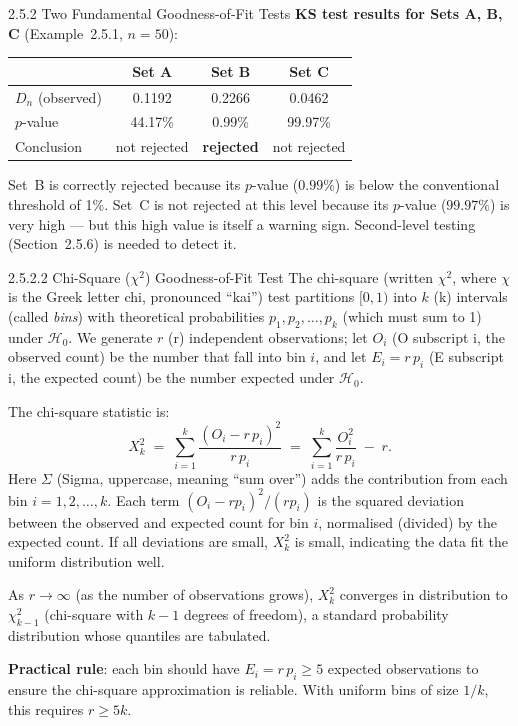 \documentclass[aspectratio=169,10pt]{beamer}
\begin{document}
\begin{frame}[allowframebreaks]{2.5.2 Two Fundamental Goodness-of-Fit Tests}
\textbf{KS test results for Sets A, B, C} (Example~2.5.1, $n=50$):
\begin{center}
\begin{tabular}{lccc}
  \toprule
  & Set A & Set B & Set C \\
  \midrule
  $D_n$ (observed) & 0.1192 & 0.2266 & 0.0462 \\
  $p$-value & 44.17\% & 0.99\% & 99.97\% \\
  Conclusion & not rejected & \textbf{rejected} & not rejected \\
  \bottomrule
\end{tabular}
\end{center}

Set~B is correctly rejected because its $p$-value ($0.99\%$) is below the
conventional threshold of 1\%.  Set~C is not rejected at this level because
its $p$-value ($99.97\%$) is very high --- but this high value is itself a
warning sign.  Second-level testing (Section~2.5.6) is needed to detect it.

\framebreak

\begin{block}{2.5.2.2 Chi-Square ($\chi^2$) Goodness-of-Fit Test}
The chi-square (written $\chi^2$, where $\chi$ is the Greek letter chi,
pronounced ``kai'') test partitions $[0,1)$ into $k$ (k) intervals
(called \emph{bins}) with theoretical probabilities $p_1, p_2, \ldots, p_k$
(which must sum to 1) under $\mathcal{H}_0$.  We generate $r$ (r) independent
observations; let $O_i$ (O subscript i, the observed count) be the number
that fall into bin $i$, and let $E_i = r\,p_i$ (E subscript i, the
expected count) be the number expected under $\mathcal{H}_0$.

The chi-square statistic is:
\[
  X_k^2 \;=\; \sum_{i=1}^k \frac{(O_i - r\,p_i)^2}{r\,p_i}
           \;=\; \sum_{i=1}^k \frac{O_i^2}{r\,p_i} \;-\; r.
\]
Here $\Sigma$ (Sigma, uppercase, meaning ``sum over'') adds the contribution
from each bin $i = 1, 2, \ldots, k$.  Each term $(O_i - rp_i)^2 / (rp_i)$
is the squared deviation between the observed and expected count for bin $i$,
normalised (divided) by the expected count.  If all deviations are small,
$X_k^2$ is small, indicating the data fit the uniform distribution well.

As $r \to \infty$ (as the number of observations grows), $X_k^2$ converges
in distribution to $\chi^2_{k-1}$ (chi-square with $k-1$ degrees of
freedom), a standard probability distribution whose quantiles are tabulated.

\textbf{Practical rule}: each bin should have $E_i = r\,p_i \ge 5$ expected
observations to ensure the chi-square approximation is reliable.  With
uniform bins of size $1/k$, this requires $r \ge 5k$.
\end{block}


\end{frame}
\end{document}
